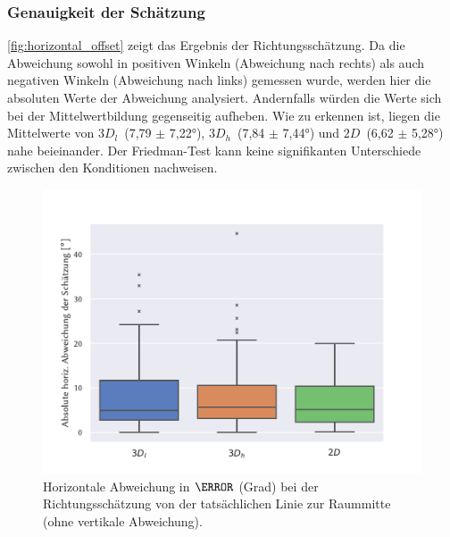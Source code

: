 \subsubsection*{Genauigkeit der Schätzung}
\autoref{fig:horizontal_offset} zeigt das Ergebnis der Richtungsschätzung.
Da die Abweichung sowohl in positiven Winkeln (Abweichung nach rechts) als auch negativen Winkeln (Abweichung nach links) gemessen wurde, werden hier die absoluten Werte der Abweichung analysiert.
Andernfalls würden die Werte sich bei der Mittelwertbildung gegenseitig aufheben.
Wie zu erkennen ist, liegen die Mittelwerte von $3D_l$~(7,79 $\pm$ \ang{7,22}), $3D_h$~(7,84 $\pm$ \ang{7,44}) und $2D$~(6,62 $\pm$ \ang{5,28}) nahe beieinander.
Der Friedman-Test kann keine signifikanten Unterschiede zwischen den Konditionen nachweisen.
\begin{figure}
    \centering
    \includegraphics[height=0.45\textheight]{figures/analysis/horizontal_offset}
    \caption{Horizontale Abweichung in $\degree$ (Grad) bei der Richtungsschätzung von der tatsächlichen Linie zur Raummitte (ohne vertikale Abweichung).}
    \label{fig:horizontal_offset}
\end{figure}

